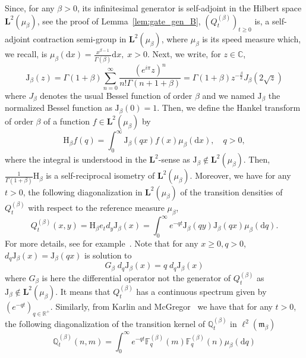 \documentclass[10pt]{amsart}
\theoremstyle{definition}\newtheorem{defi}[theo]{Definition}\newtheorem{rema}[theo]{Remark}\newtheorem{exam}[theo]{Example}\newtheorem{exem}[theo]{Example}\newtheorem{nota}[theo]{Notation}
\newcommand{\fm}{\mathfrak{m}}
\newcommand{\esL}{\mathbf{L}}
\newcommand{\esLd}{\ell}
\newcommand{\Hg}{{\mathrm{H}}_{\beta}}
\newcommand{\Jg}{{\mathrm{J}}_{\beta}}
\newcommand*\R{{\mathbb R}}
\newcommand{\cont}[1]{{#1}}
\newcommand{\Lv}{\esL^2(\mu_{\beta})}
\newcommand{\Lpv}{\esLd^2(\fm_{\beta})}
\newcommand*{\dd}{\mathrm{d}}
\newcommand*{\dx}{\dd x}
\begin{document}
Since, for any $\beta >0$, its infinitesimal generator is self-adjoint in the Hilbert space $\esL^{2}({\mu}_{\beta})$, see the proof of Lemma~\ref{lem:gate_gen_B}, $ (\cont{Q}^{(\beta)}_t)_{t\geq0}$ is, a self-adjoint contraction semi-group in $\esL^{2}({\mu}_{\beta})$, where ${\mu}_{\beta}$ is its speed measure which, we recall, is ${\mu}_{\beta}(\dx)=\frac{x^{\beta-1}}{\Gamma(\beta)}\dx, \; x>0.$ Next, we write, for $z \in \mathbb{C}$,
\begin{equation*}\label{eq:def_bessel}
\Jg(z)=\Gamma(1+\beta)\sum_{n=0}^{\infty}\frac{(e^{i\pi}z)^n}{n!\Gamma(n+1+\beta)}=\Gamma(1+\beta)z^{-\frac{\beta}{2}}J_{\beta}(2\sqrt{z})
\end{equation*}
where $J_{\beta}$ denotes the usual Bessel function of order $\beta$ and we named $\Jg$ the normalized Bessel function as $\Jg(0)=1$. Then, we define the Hankel transform of order $\beta$ of a function $f\in \Lv$ by
\begin{equation*}\label{eq:defn_Hankel}
\Hg f(q) = \int_0^{\infty} \Jg(qx)f(x)\mu_{\beta}(\dx), \quad q>0,
\end{equation*}
where the integral is understood in the $\esL^{2}$-sense as $\Jg \notin \Lv$. Then, $\frac{1}{\Gamma(1+\beta)}\Hg$ is a self-reciprocal isometry of $\Lv$. Moreover, we have for any $t>0$, the following diagonalization in $\Lv$ of the transition densities of $Q^{(\beta)}_t$ with respect to the reference measure $\mu_{\beta}$,
\begin{equation*}\label{eq:diagP}
Q^{(\beta)}_t (x,y)=\Hg e_{t}\cont{d}_y\Jg (x)=\int_0^{\infty}e^{-qt}\Jg(qy) \Jg(qx)\mu_{\beta}(\dd q).
\end{equation*}
For more details, see for example~\cite{Muck-Stein}. Note that for any $x\geq 0, q>0$, $\cont{d}_q\Jg(x)=\Jg(qx)$ is solution to
\begin{equation*}\label{eq:bessel-eigen}
\cont{G}_{\beta}\; \cont{d}_q\Jg(x)=q\; \cont{d}_q\Jg(x)
\end{equation*}
where $\cont{G}_{\beta}$ is here the differential operator not the generator of $\cont{Q}_t^{(\beta)}$ as $\Jg \notin \Lv$. It means that $\cont{Q}_t^{(\beta)}$ has a continuous spectrum given by $(e^{-qt})_{q\in \R^+}$. Similarly, from Karlin and McGregor~\cite{KMcGlinear} we have that for any $t>0$, the following diagonalization of the transition kernel of $\mathbb Q^{(\beta)}_t$ in $\Lpv$
\begin{equation*}
\mathbb Q^{(\beta)}_t (n,m)=\int_0^{\infty}e^{-qt} {\mathbb{F}}^{(\beta)}_q(m) {\mathbb{F}}^{(\beta)}_q(n)\mu_{\beta}(\dd q)
\end{equation*}
\end{document}

